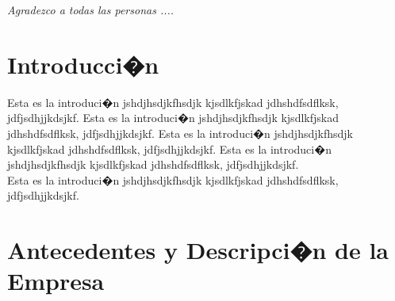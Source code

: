 \documentclass[12pt,letterpaper,spanish, xcolor=table]{report}
\newenvironment{dedication}{\newpage\large\null\em\vskip1in}%
{\vfill}
\begin{document}
        \thispagestyle{empty}

        \begin{dedication}
           Agradezco a todas las personas ....
        \end{dedication}




\tableofcontents



\oddsidemargin 0.2in \textwidth 6.5in \topmargin -0.25in
\textheight 9in \pagestyle{myheadings}

\newpage



\chapter{Introducci�n}
\newpage


Esta es la introduci�n jshdjhsdjkfhsdjk kjsdlkfjskad jdhshdfsdflksk, jdfjsdhjjkdsjkf.
Esta es la introduci�n jshdjhsdjkfhsdjk kjsdlkfjskad jdhshdfsdflksk, jdfjsdhjjkdsjkf.
Esta es la introduci�n jshdjhsdjkfhsdjk kjsdlkfjskad jdhshdfsdflksk, jdfjsdhjjkdsjkf.
Esta es la introduci�n jshdjhsdjkfhsdjk kjsdlkfjskad jdhshdfsdflksk, jdfjsdhjjkdsjkf.
\\




Esta es la introduci�n jshdjhsdjkfhsdjk kjsdlkfjskad jdhshdfsdflksk, jdfjsdhjjkdsjkf.



\chapter{Antecedentes y Descripci�n de la Empresa}
\newpage
\end{document}
